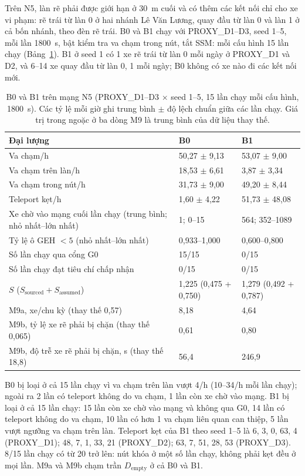 \documentclass[../main.tex]{subfiles}
\begin{document}
Trên N5, làn rẽ phải được giới hạn ở 30~m cuối và có thêm các kết nối chỉ cho xe vi phạm: rẽ trái từ làn 0 ở hai nhánh Lê Văn Lương, quay đầu từ làn 0 và làn 1 ở cả bốn nhánh, theo đèn rẽ trái. B0 và B1 chạy với PROXY\_D1--D3, seed 1--5, mỗi lần 1800~s, bật kiểm tra va chạm trong nút, tắt SSM: mỗi cấu hình 15 lần chạy (Bảng~\ref{table:4.ref_n29}). B1 ở seed 1 có 1 xe rẽ trái từ làn 0 mỗi ngày ở PROXY\_D1 và D2, và 6--14 xe quay đầu từ làn 0, 1 mỗi ngày; B0 không có xe nào đi các kết nối mới.

\begin{table}[!htbp]
\centering
\small
\caption{B0 và B1 trên mạng N5 (PROXY\_D1--D3 $\times$ seed 1--5, 15 lần chạy mỗi cấu hình, 1800~s). Các tỷ lệ mỗi giờ ghi trung bình $\pm$ độ lệch chuẩn giữa các lần chạy. Giá trị trong ngoặc ở ba dòng M9 là trung bình của dữ liệu thay thế.} \label{table:4.ref_n29}
\begin{tabular}{|>{\raggedright\arraybackslash}p{5.5cm}|p{4.0cm}|p{4.0cm}|}
\hline
\textbf{Đại lượng} & \textbf{B0} & \textbf{B1} \\ \hline
Va chạm/h & 50,27 $\pm$ 9,13 & 53,07 $\pm$ 9,00 \\ \hline
Va chạm trên làn/h & 18,53 $\pm$ 6,61 & 3,87 $\pm$ 3,34 \\ \hline
Va chạm trong nút/h & 31,73 $\pm$ 9,00 & 49,20 $\pm$ 8,44 \\ \hline
Teleport kẹt/h & 1,60 $\pm$ 4,22 & 51,73 $\pm$ 48,08 \\ \hline
Xe chờ vào mạng cuối lần chạy (trung bình; nhỏ nhất--lớn nhất) & 1; 0--15 & 564; 352--1089 \\ \hline
Tỷ lệ ô GEH $<5$ (nhỏ nhất--lớn nhất) & 0,933--1,000 & 0,600--0,800 \\ \hline
Số lần chạy qua cổng G0 & 15/15 & 0/15 \\ \hline
Số lần chạy đạt tiêu chí chấp nhận & 0/15 & 0/15 \\ \hline
$S$ ($S_{\text{sourced}} + S_{\text{assumed}}$) & 1,225 (0,475 + 0,750) & 1,279 (0,492 + 0,787) \\ \hline
M9a, xe/chu kỳ (thay thế 0,57) & 8,18 & 4,64 \\ \hline
M9b, tỷ lệ xe rẽ phải bị chặn (thay thế 0,065) & 0,61 & 0,80 \\ \hline
M9b, độ trễ xe rẽ phải bị chặn, s (thay thế 18,8) & 56,4 & 246,9 \\ \hline
\end{tabular}
\end{table}

B0 bị loại ở cả 15 lần chạy vì va chạm trên làn vượt 4/h (10--34/h mỗi lần chạy); ngoài ra 2 lần có teleport không do va chạm, 1 lần còn xe chờ vào mạng. B1 bị loại ở cả 15 lần chạy: 15 lần còn xe chờ vào mạng và không qua G0, 14 lần có teleport không do va chạm, 10 lần có hơn 1 va chạm liên quan can thiệp, 5 lần vượt ngưỡng va chạm trên làn. Teleport kẹt của B1 theo seed 1--5 là 6, 3, 0, 63, 4 (PROXY\_D1); 48, 7, 1, 33, 21 (PROXY\_D2); 63, 7, 51, 28, 53 (PROXY\_D3). 8/15 lần chạy có từ 20 trở lên: nút khóa ở một số lần chạy, không phải kẹt đều ở mọi lần. M9a và M9b chạm trần $D_{\text{empty}}$ ở cả B0 và B1.
\end{document}
